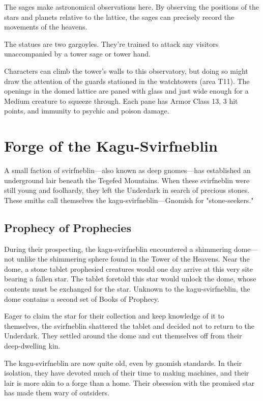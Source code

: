 \documentclass[10pt,a4paper,twoside,bg=print,twocolumn,openany,nodeprecatedcode]{dndbook}
\begin{document}
The sages make astronomical observations here. By observing the positions of the stars and planets relative to the lattice, the sages can precisely record the movements of the heavens.

The statues are two gargoyles. They're trained to attack any visitors unaccompanied by a tower sage or tower hand.

Characters can climb the tower's walls to this observatory, but doing so might draw the attention of the guards stationed in the watchtowers (area T11). The openings in the domed lattice are paned with glass and just wide enough for a Medium creature to squeeze through. Each pane has Armor Class 13, 3 hit points, and immunity to psychic and poison damage.

\section{Forge of the Kagu-Svirfneblin}
A small faction of svirfneblin—also known as deep gnomes—has established an underground lair beneath the Tegefed Mountains. When these svirfneblin were still young and foolhardy, they left the Underdark in search of precious stones. These smiths call themselves the kagu-svirfneblin—Gnomish for "stone-seekers."

\subsection{Prophecy of Prophecies}
During their prospecting, the kagu-svirfneblin encountered a shimmering dome—not unlike the shimmering sphere found in the Tower of the Heavens. Near the dome, a stone tablet prophesied creatures would one day arrive at this very site bearing a fallen star. The tablet foretold this star would unlock the dome, whose contents must be exchanged for the star. Unknown to the kagu-svirfneblin, the dome contains a second set of Books of Prophecy.

Eager to claim the star for their collection and keep knowledge of it to themselves, the svirfneblin shattered the tablet and decided not to return to the Underdark. They settled around the dome and cut themselves off from their deep-dwelling kin.

The kagu-svirfneblin are now quite old, even by gnomish standards. In their isolation, they have devoted much of their time to making machines, and their lair is more akin to a forge than a home. Their obsession with the promised star has made them wary of outsiders.
\end{document}

